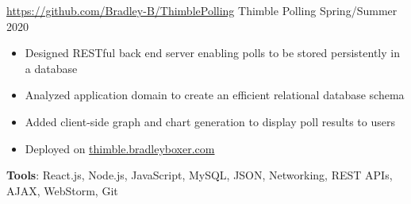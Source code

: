 \documentclass{awesome-cv}
\begin{document}
			\vspace{-0.1cm}
		\begin{cventries}

			\cventry
				{\href{https://github.com/Bradley-B/ThimblePolling}{https://github.com/Bradley-B/ThimblePolling}}
				{Thimble Polling}
				{Spring/Summer 2020}
				{}
				{
					\vspace{-0.3cm}
					\begin{itemize}[nosep]
						\item Designed RESTful back end server enabling polls to be stored persistently in a database
						\item Analyzed application domain to create an efficient relational database schema
						\item Added client-side graph and chart generation to display poll results to users
						\item Deployed on \href{http://thimble.bradleyboxer.com}{thimble.bradleyboxer.com}
					\end{itemize}
					\vspace{0.2cm}
					\qquad \textbf{Tools}: React.js, Node.js, JavaScript, MySQL, JSON, Networking, REST APIs, AJAX, WebStorm, Git
				}
		
		


\end{cventries}
\end{document}
